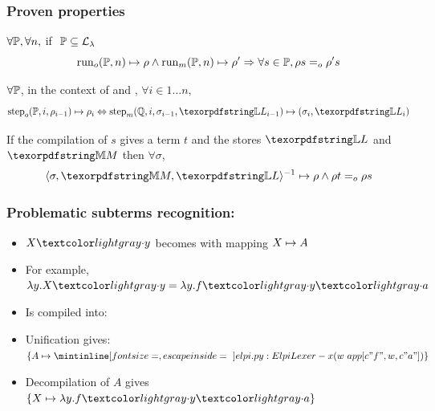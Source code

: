 \documentclass{pres}
\newtheorem{proposition}[theorem]{Proposition}
\begin{document}
\begin{frame}
  \frametitle{Proven properties}

  \begin{description}[]
    \item[Run Equivalence]
    $\forall \foUnifPb, \forall n,$ if $~\foUnifPb \subseteq \llambda$
    $$
      \runFx{\foUnifPb}{n}{\rho} \land
      \runHx{\foUnifPb}{n}{\rho'}
      \Rightarrow
      \forall s \in \foUnifPb, \rho s \Eo \rho' s
    $$
    \item [Simulation fidelity]
    $\forall \foUnifPb$, in the context of  \frun and \hrun,
    $\forall i \in 1 \ldots n,$
    $$\stepF{\foUnifPb}{i}{\rho_{i-1}}{\rho_i}
    \Leftrightarrow
    \stepH{\hoUnifPb}{i}{\sigma_{i-1}}{\linkStore_{i-1}}{\sigma_i}{\linkStore_i}
    $$
    \item[Compilation round trip]
      If the compilation of $s$ gives a term $t$ and the stores $\linkStore$ and $\mapStore$
      then $\forall \sigma$,
      $$\D{\sigma}{\mapStore}{\linkStore}{\rho} \land \rho t \Eo \rho s$$
  \end{description}

\end{frame}

\begin{frame}
  \frametitle{Problematic subterms recognition: \maybebeta}

  \begin{itemize}
    \item $X\appsep y$ becomes  with mapping $\mapping{X}{A}{1}$
    \item For example, $\lambda y. X\appsep y = \lambda y. f\appsep y\appsep a$
    \item Is compiled into: 
    \item Unification gives: $\{A \mapsto \elpiIn{(w\ app[c"f", w, c"a"])}\}$
    \item Decompilation of $A$ gives $\{X \mapsto \lambda y.f\appsep y\appsep a\}$
  \end{itemize}

\end{frame}
\end{document}
